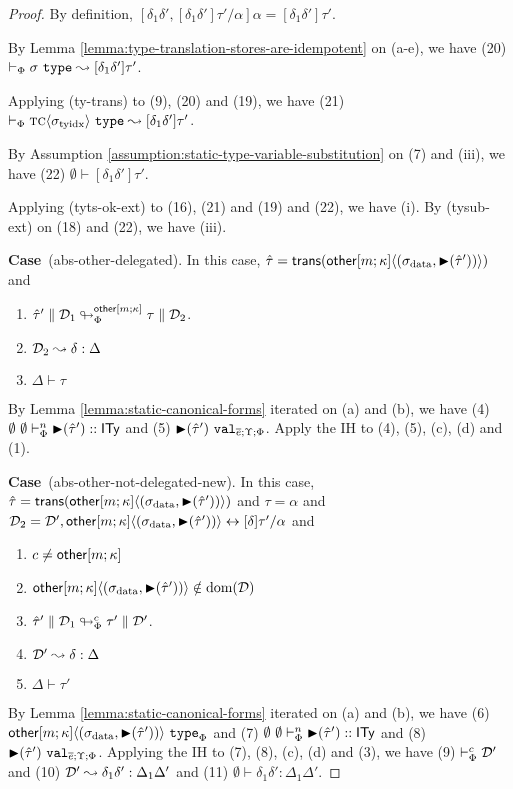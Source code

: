 \documentclass[12pt]{article}
\newcommand{\pfcase}[1]{\textbf{Case}~#1. }
\begin{document}
\begin{proof}
By definition,  $[\delta_1\delta', [\delta_1\delta']\tau'/\alpha]\alpha=[\delta_1\delta']\tau'$.

By Lemma \ref{lemma:type-translation-stores-are-idempotent} on (a-e), we have (20) $\tytransX{\st}{[\delta_1\delta']\tau'}$.

Applying (ty-trans) to (9), (20) and (19), we have (21) $\tytransX{\sty{\tc}{\sttyidx}}{[\delta_1\delta']\tau'}$. 

By Assumption \ref{assumption:static-type-variable-substitution} on (7) and (iii), we have (22) $\emptyset \vdash [\delta_1\delta']\tau'$.

Applying (tyts-ok-ext) to (16), (21) and (19) and (22), we have (i). By (tysub-ext) on (18) and (22), we have (iii).

\pfcase{(abs-other-delegated)} In this case, $\qity=\srep{\sty{\otherc{m}{\kappa}}{(\stx{data}, \sqity{\qity'})}}$ and \begin{enumerate}
    \item $\tdeabs{\Phi}{\otherc{m}{\kappa}}{\qity'}{\memD_1}{\tau}{\memD_2}$.
    \item $\memD_2 \leadsto \delta : \Delta$
    \item $\Delta \vdash \tau$
\end{enumerate}

By Lemma \ref{lemma:static-canonical-forms} iterated on (a) and (b), we have (4) $\sofkVX{\sqity{\qity'}}{\kity}$ and (5) $\sval{\sqity{\qity'}}{\es;\Upsilon;\Phi}$. Apply the IH to (4), (5), (c), (d) and (1).

\pfcase{(abs-other-not-delegated-new)} In this case, $\qity=\srep{\sty{\otherc{m}{\kappa}}{(\stx{data}, \sqity{\qity'})}}$ and $\tau=\alpha$ and $\memD_2 = \memD', \sty{\otherc{m}{\kappa}}{(\stx{data}, \sqity{\qity'})} \leftrightarrow [\delta]\tau'/\alpha$ and \begin{enumerate}
    \item $c \neq \otherc{m}{\kappa}$
    \item $\sty{\otherc{m}{\kappa}}{(\stx{data}, \sqity{\qity'})} \notin \text{dom}(\memD)$
    \item $\tdeabs{\Phi}{c}{\qity'}{\memD_1}{\tau'}{\memD'}$.
    \item $\memD' \leadsto \delta : \Delta$
    \item $\Delta \vdash \tau'$
\end{enumerate}

By Lemma \ref{lemma:static-canonical-forms} iterated on (a) and (b), we have (6) $\istype{\sty{\otherc{m}{\kappa}}{(\stx{data}, \sqity{\qity'})}}{\Phi}$ and (7) $\sofkVX{\sqity{\qity'}}{\kity}$ and (8) $\sval{\sqity{\qity'}}{\es;\Upsilon;\Phi}$. Applying the IH to (7), (8), (c), (d) and (3), we have (9) $\tytsvX{\memD'}$ and (10) $\memD' \leadsto \delta_1\delta' : \Delta_1\Delta'$ and (11) $\emptyset \vdash \delta_1\delta' : \Delta_1\Delta'$.


\end{proof}
\end{document}
